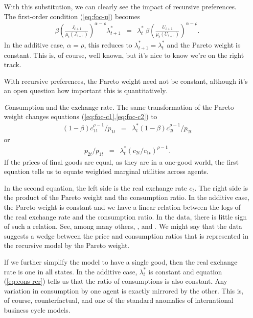 With this substitution, we can clearly see the impact of recursive preferences.
The first-order condition (\ref{eq:foc-u}) becomes
\begin{eqnarray}
    \beta \left( \frac{{J}_{t+1}} {\mu_t({J}_{t+1})} \right)^{\alpha-\rho}
                  \lambda^*_{t+1}
            &=&  \lambda^*_t \
            \beta \left( \frac{{U}_{t+1}} {\mu_t({U}_{t+1})} \right)^{\alpha-\rho} .
            \label{eq:foc-u-additive}
\end{eqnarray}
In the additive case, $\alpha=\rho$, this reduces to
$ \lambda^*_{t+1}  = \lambda^*_{t} $ and  the Pareto weight is constant.
This is, of course, well known, but it's nice to know we're on the right track.


With recursive preferences, the Pareto weight need not be constant, although it's an open
question how important this is quantitatively.


{\textit Consumption and the exchange rate.\/}
The same transformation of the Pareto weight changes equations (\ref{eq:foc-c1},\ref{eq:foc-c2}) to
\begin{eqnarray*}
    (1-\beta) c_{1t}^{\rho-1} / p_{1t} &=& \lambda_t^* (1-\beta) c_{2t}^{\rho-1} / p_{2t}
\end{eqnarray*}
or
\begin{eqnarray}
    p_{2t} / p_{1t} &=& \lambda_t^* (c_{2t}/c_{1t})^{\rho-1} .
    \label{eq:cons-rer}
\end{eqnarray}
If the prices of final goods are equal, as they are in a one-good world,
the first equation tells us to equate weighted marginal utilities across agents.

In the second equation, the left side is the real exchange rate $e_t$.
The right side is the product of the Pareto weight
and the consumption ratio.
In the additive case, the Pareto weight is constant and we have a linear relation between
the logs of the real exchange rate and the consumption ratio.
In the data, there is little sign of such a relation.
See, among many others, \citet{Backus1993-ul,Chari2002-ll,Corsetti2008-lx,Colacito2013-yq,Kollmann1995-fe}, and \citet{Tretvoll2011-lo}.
We might say that the data suggests a wedge between the price and consumption ratios
that is represented in the recursive model by the Pareto weight.

If we further simplify the model to have a single good,
then the real exchange rate is one in all states.
In the additive case,
$\lambda_t^*$ is constant
and equation (\ref{eq:cons-rer}) tells us that the ratio of consumptions is also constant.
Any variation in consumption by one agent is exactly mirrored by the other.
This is, of course, counterfactual, and one of the standard anomalies
of international business cycle models.


